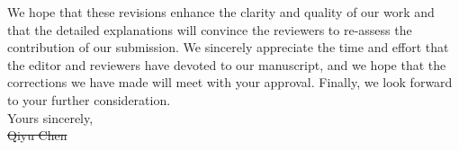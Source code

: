 We hope that these revisions enhance the clarity and quality of our work and
that the detailed explanations will convince the reviewers to re-assess the contribution of our submission.
We sincerely appreciate the time and effort that the editor and reviewers have devoted to our manuscript,
and we hope that the corrections we have made will meet with your approval.
Finally, we look forward to your further consideration. \\

\noindent Yours sincerely,\\

\noindent \sout{Qiyu Chen}\\

\clearpage